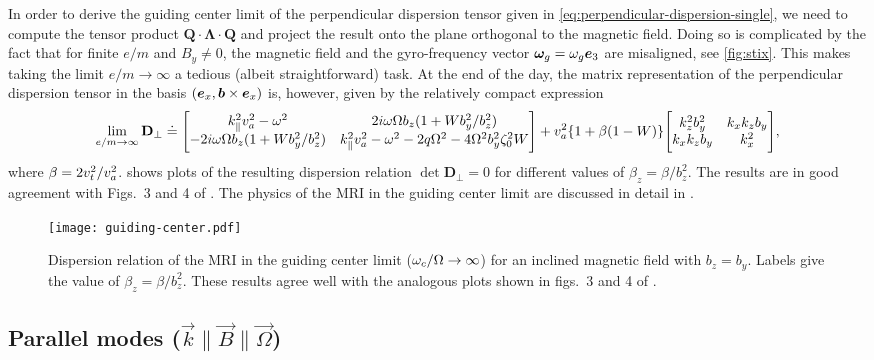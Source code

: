 \documentclass[aps,pre,notitlepage,amsmath,amssymb,amsfonts,nobibnotes,nofootinbib]{revtex4-1}
\begin{document}
In order to derive the guiding center limit of the perpendicular dispersion
tensor given in \cref{eq:perpendicular-dispersion-single}, we need to compute
the tensor product $\mathbf{Q}\cdot\mathbf{\Lambda}\cdot\mathbf{Q}$ and
project the result onto the plane orthogonal to the magnetic field. Doing so
is complicated by the fact that for finite $e/m$ and $B_y\ne{}0$, the magnetic
field and the gyro-frequency vector $\bm{\omega}_g=\omega_g\bm{e}_3$ are misaligned, see
\cref{fig:stix}. This makes taking the limit $e/m\to\infty$ a tedious (albeit
straightforward) task. At the end of the day, the matrix representation of the
perpendicular dispersion tensor 
in the basis $(\bm{e}_x,\bm{b}\times\bm{e}_x)$ is, however, given by the relatively
compact expression
\begingroup
\renewcommand*{\arraystretch}{1.4}
\begin{equation}
  \label{eq:DRguiding}
  \lim_{e/m\to\infty}\mathbf{D}_\perp \doteq
  \Bigg[\begin{matrix}
    k_\parallel^2\va^2 - \omega^2
    & 2i\omega\Omega b_z (1 + Wb_y^2/b_z^2) \\
    - 2i\omega\Omega b_z (1 + Wb_y^2/b_z^2)
    & k_\parallel^2\va^2 - \omega^2 - 2q\Omega^2 - 4\Omega^2b_y^2\zeta_0^2W
  \end{matrix}\Bigg]
  + \va^2\{1 + \beta(1-W)\}
  \Bigg[\begin{matrix}
    k_z^2 b_y^2 & k_x k_z b_y \\
    k_x k_z b_y & k_x^2
  \end{matrix}\Bigg],
\end{equation}
\endgroup
where $\beta=2v_t^2/v_a^2$.  shows plots of the
resulting dispersion relation $\det\mathbf{D}_\perp=0$ for different values of
$\beta_z=\beta/b_z^2$. The results are in good agreement with Figs.~3 and 4 of
\citet{Quataert2002}. The physics of the MRI in the guiding center limit are
discussed in detail in \citet{Quataert2002} \citep[see also][]{Balbus2004}.

\begin{figure}
  \centering\texttt{[image: guiding-center.pdf]}
  \caption{Dispersion relation of the MRI in the guiding center limit
    ($\omega_c/\Omega\to\infty$) for an inclined magnetic field with $b_z=b_y$.
    Labels give the value of $\beta_z=\beta/b_z^2$. These results agree well
    with the analogous plots shown in figs.~3 and 4 of
    \citet{Quataert2002}.}\label{fig:guiding-center}
\end{figure}

\subsection{Parallel modes
  ($\vec{k}\bm{\parallel}\vec{B}\bm{\parallel}\vec{\Omega}$)}
\label{sec:par}
\end{document}

